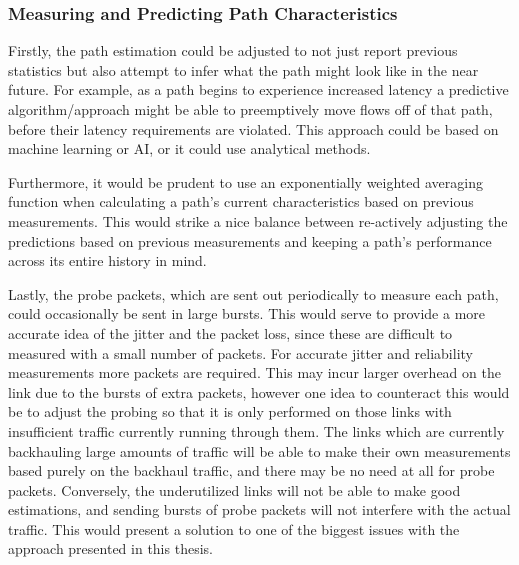 \subsubsection{Measuring and Predicting Path Characteristics}
Firstly, the path estimation could be adjusted to not just report previous statistics but also attempt to infer what the path might look like in the near future. For example, as a path begins to experience increased latency a predictive algorithm/approach might be able to preemptively move flows off of that path, before their latency requirements are violated. This approach could be based on machine learning or AI, or it could use analytical methods.

Furthermore, it would be prudent to use an exponentially weighted averaging function when calculating a path's current characteristics based on previous measurements. This would strike a nice balance between re-actively adjusting the predictions based on previous measurements and keeping a path's performance across its entire history in mind.


Lastly, the probe packets, which are sent out periodically to measure each path, could occasionally be sent in large bursts. This would serve to provide a more accurate idea of the jitter and the packet loss, since these are difficult to measured with a small number of packets. For accurate jitter and reliability measurements more packets are required. This may incur larger overhead on the link due to the bursts of extra packets, however one idea to counteract this would be to adjust the probing so that it is only performed on those links with insufficient traffic currently running through them. The links which are currently backhauling large amounts of traffic will be able to make their own measurements based purely on the backhaul traffic, and there may be no need at all for probe packets. Conversely, the underutilized links will not be able to make good estimations, and sending bursts of probe packets will not interfere with the actual traffic. This would present a solution to one of the biggest issues with the approach presented in this thesis.

